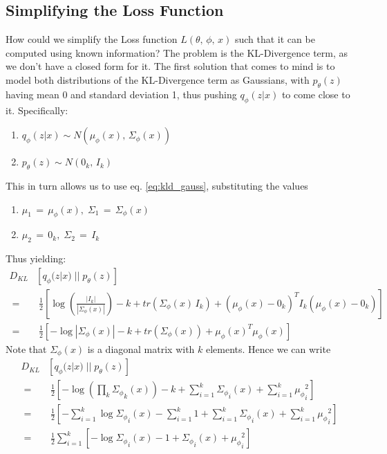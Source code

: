 \documentclass[12pt]{report}
\begin{document}
\subsection*{Simplifying the Loss Function}
How could we simplify the Loss function $L(\theta,\, \phi,\, x)$ such that it can be
computed using known information? The problem is the KL-Divergence term, as we don't
have a closed form for it. The first solution that comes to mind is to model both
distributions of the KL-Divergence term as Gaussians, with $p_{\theta}(z)$ having
mean 0 and standard deviation 1, thus pushing $q_{\phi}(z | x)$ to come close
to it. Specifically:
\begin{enumerate}
    \item $q_{\phi}(z | x) \sim N(\mu_{\phi}(x),\, \Sigma_{\phi}(x))$
    \item $p_{\theta}(z) \sim N(0_k,\, I_k)$
\end{enumerate}

\noindent This in turn allows us to use eq. \eqref{eq:kld_gauss}, substituting the values
\begin{enumerate}
    \item $\mu_1 \,=\, \mu_{\phi}(x),\; \Sigma_1 \,=\, \Sigma_{\phi}(x)$
    \item $\mu_2 \,=\, 0_k,\; \Sigma_2 \,=\, I_k$
\end{enumerate}
Thus yielding:
\begin{align*}
    D_{KL}&\left[q_{\phi}(z | x) \;||\; p_{\theta}(z) \right] \\[2ex]
    \;=&\; \frac{1}{2} \left[ \log \left(\frac{|I_k|}{|\Sigma_{\phi}(x)|} \right)
        - k
        + tr(\Sigma_{\phi}(x) \, I_k)
        + (\mu_{\phi}(x) - 0_k)^T I_k (\mu_{\phi}(x) - 0_k) \right] \\[2ex]
    \;=&\; \frac{1}{2} \left[ -\log |\Sigma_{\phi}(x)|
        - k
        + tr(\Sigma_{\phi}(x))
        + \mu_{\phi}(x)^T \mu_{\phi}(x) \right]
\end{align*}
Note that $\Sigma_{\phi}(x)$ is a diagonal matrix with $k$ elements. Hence we can
write
\begin{align*}
    D_{KL}&\left[q_{\phi}(z | x) \;||\; p_{\theta}(z) \right] \\[2ex]
    \;=&\; \frac{1}{2} \left[ -\log \left( \prod_k {\Sigma_{\phi}}_k(x) \right)
        - k
        + \sum_{i=1}^k {\Sigma_{\phi}}_i(x)
        + \sum_{i=1}^k {\mu_{\phi}}_i^2 \right] \\[2ex]
    \;=&\; \frac{1}{2} \left[ - \sum_{i=1}^k \log {\Sigma_{\phi}}_i(x)
        - \sum_{i=1}^k 1
        + \sum_{i=1}^k {\Sigma_{\phi}}_i(x)
        + \sum_{i=1}^k {\mu_{\phi}}_i^2 \right] \\[2ex]
    \;=&\; \frac{1}{2} \sum_{i=1}^k \left[ - \log {\Sigma_{\phi}}_i(x)
        - 1
        + {\Sigma_{\phi}}_i(x)
        + {\mu_{\phi}}_i^2 \right] \\[2ex]
\end{align*}
\end{document}
